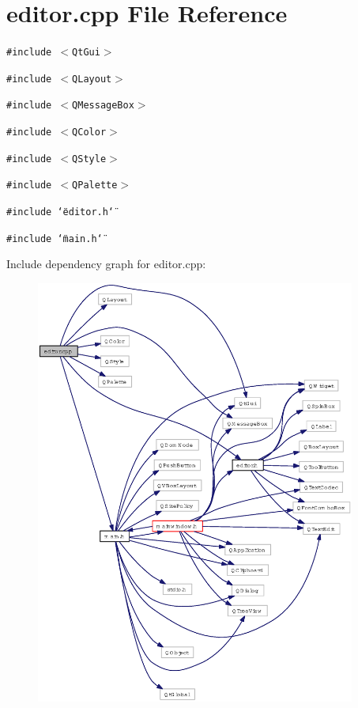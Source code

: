 \section{editor.cpp File Reference}
\label{editor_8cpp}
{\tt \#include $<$Qt\-Gui$>$}\par
{\tt \#include $<$QLayout$>$}\par
{\tt \#include $<$QMessage\-Box$>$}\par
{\tt \#include $<$QColor$>$}\par
{\tt \#include $<$QStyle$>$}\par
{\tt \#include $<$QPalette$>$}\par
{\tt \#include \char`\"{}editor.h\char`\"{}}\par
{\tt \#include \char`\"{}main.h\char`\"{}}\par


Include dependency graph for editor.cpp:\begin{figure}[H]
\begin{center}
\leavevmode
\includegraphics[width=298pt]{editor_8cpp__incl}
\end{center}
\end{figure}
